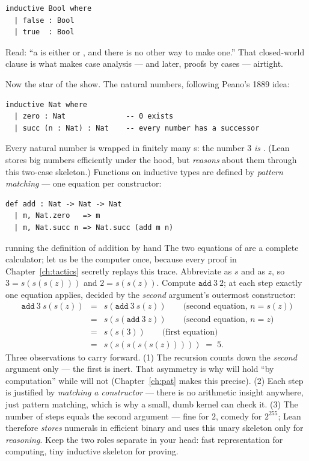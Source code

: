 \begin{lstlisting}[language=Lean]
inductive Bool where
  | false : Bool
  | true  : Bool
\end{lstlisting}

Read: ``a  is either  or , and there is no
other way to make one.'' That closed-world clause is what makes case analysis
--- and later, proofs by cases --- airtight.

Now the star of the show. The natural numbers, following Peano's 1889 idea:

\begin{lstlisting}[language=Lean]
inductive Nat where
  | zero : Nat              -- 0 exists
  | succ (n : Nat) : Nat    -- every number has a successor
\end{lstlisting}

Every natural number is  wrapped in finitely many s:
the number 3 \emph{is} . (Lean stores big
numbers efficiently under the hood, but \emph{reasons} about them through
this two-case skeleton.) Functions on inductive types are defined by
\emph{pattern matching} --- one equation per constructor:

\begin{lstlisting}[language=Lean]
def add : Nat -> Nat -> Nat
  | m, Nat.zero   => m
  | m, Nat.succ n => Nat.succ (add m n)
\end{lstlisting}

\begin{worked}{running the definition of addition by hand}
The two equations of  are a complete calculator; let us be the
computer once, because every proof in Chapter~\ref{ch:tactics} secretly
replays this trace. Abbreviate  as $s$ and 
as $z$, so $3 = s(s(s(z)))$ and $2 = s(s(z))$. Compute
$\mathtt{add}\ 3\ 2$; at each step exactly one equation applies, decided by
the \emph{second} argument's outermost constructor:
\[
\begin{array}{lcl}
\mathtt{add}\ 3\ s(s(z)) &=& s(\mathtt{add}\ 3\ s(z))
   \qquad\text{(second equation, } n = s(z))\\
 &=& s(s(\mathtt{add}\ 3\ z))
   \qquad\text{(second equation, } n = z)\\
 &=& s(s(3))
   \qquad\text{(first equation)}\\
 &=& s(s(s(s(s(z))))) \;=\; 5 .
\end{array}
\]
Three observations to carry forward. (1) The recursion counts down the
\emph{second} argument only --- the first is inert. That asymmetry is why
 will hold ``by computation'' while  will
not (Chapter~\ref{ch:pat} makes this precise). (2) Each step is justified
by \emph{matching a constructor} --- there is no arithmetic insight
anywhere, just pattern matching, which is why a small, dumb kernel can
check it. (3) The number of steps equals the second argument --- fine for
$2$, comedy for $2^{255}$; Lean therefore \emph{stores} numerals in
efficient binary and uses this unary skeleton only for \emph{reasoning}.
Keep the two roles separate in your head: fast representation for
computing, tiny inductive skeleton for proving.
\end{worked}

